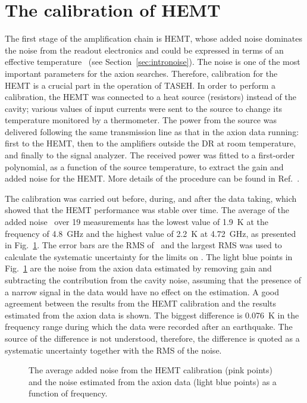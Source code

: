 \section{The calibration of HEMT}
\label{sec:hemtcalibration}

The first stage of the amplification chain is HEMT, whose added noise 
dominates the noise from the readout electronics and could be 
expressed in terms of an effective temperature \ta\ 
(see Section~\ref{sec:intronoise}). The noise is one of the most important 
parameters for the axion searches. Therefore, calibration for the HEMT is a 
crucial part in the operation of TASEH. In order to perform a calibration, 
the HEMT was connected to a heat source (resistors) instead of the cavity; 
various values of input currents were sent to the source to change its 
temperature monitored by a thermometer. The power from the source 
was delivered following the same transmission line as that in the axion 
data running: first to the HEMT, then to the amplifiers outside the DR at room 
temperature, and finally to the signal analyzer. The received power was 
fitted to a first-order polynomial, as a function of the source temperature, 
to extract the gain and added noise for the HEMT. More details of the 
procedure can be found in Ref.~\cite{TASEHInstrumentation}. 

The calibration was carried out before, 
during, and after the data taking, which showed that the HEMT performance 
was stable over time. The average of the added noise \ta\ over 19 measurements 
has the lowest value of 1.9~K at the frequency of 4.8~GHz and the highest value of 
2.2~K at 4.72~GHz, as presented in Fig.~\ref{fig:hemtcalvsf}. 
The error bars are the RMS of \ta\ and the largest RMS was used to calculate 
the systematic uncertainty for the limits on \gagg. The light blue points in 
Fig.~\ref{fig:hemtcalvsf} are the noise from the axion data estimated by 
removing gain and subtracting the contribution from the cavity noise, assuming 
that the presence of a narrow signal in the data would have no effect on the 
estimation. A good agreement between the results from the HEMT calibration  
and the results estimated from the axion data is shown. The biggest 
difference is 0.076~K in the frequency range during which the data were 
recorded after an earthquake. The source of the difference is not understood, 
therefore, the difference is quoted as a systematic uncertainty together 
with the RMS of the noise.

\begin{figure} [htbp]
  \centering
  \caption{The average added noise from the HEMT calibration (pink points) and 
 the noise estimated from the axion data (light blue points) as a function of frequency.}
  \label{fig:hemtcalvsf}
\end{figure}


  

